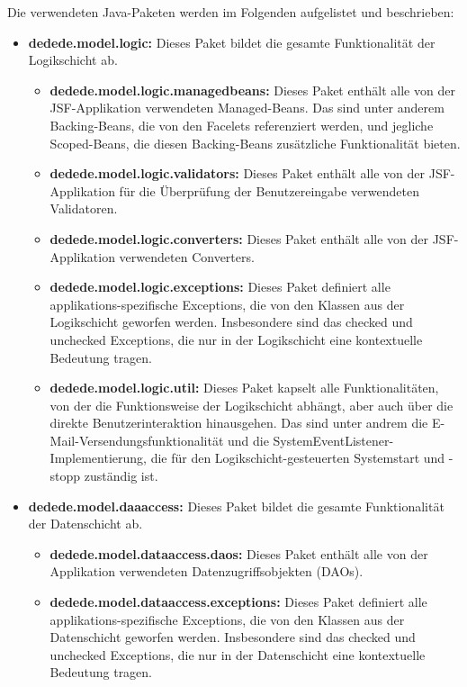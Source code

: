 \documentclass{article}
\begin{document}
Die verwendeten Java-Paketen werden im Folgenden aufgelistet und beschrieben:
\begin{itemize}
	\item \textbf{dedede.model.logic:} \hypertarget{Logikschicht}{Dieses Paket} bildet die gesamte Funktionalität der Logikschicht ab.
		\begin{itemize}
			\item \textbf{dedede.model.logic.managedbeans:} Dieses Paket enthält alle von der JSF-Applikation verwendeten Managed-Beans.
				Das sind unter anderem Backing-Beans, die von den Facelets referenziert werden, und jegliche Scoped-Beans, die diesen Backing-Beans zusätzliche Funktionalität bieten.
			\item \textbf{dedede.model.logic.validators:} Dieses Paket enthält alle von der JSF-Applikation für die Überprüfung der Benutzereingabe verwendeten Validatoren.
			\item \textbf{dedede.model.logic.converters:} Dieses Paket enthält alle von der JSF-Applikation verwendeten Converters.
			\item \textbf{dedede.model.logic.exceptions:} Dieses Paket definiert alle applikations-spezifische Exceptions, die von den Klassen aus der Logikschicht geworfen werden.
				Insbesondere sind das checked und unchecked Exceptions, die nur in der Logikschicht eine kontextuelle Bedeutung tragen.
			\item \textbf{dedede.model.logic.util:} Dieses Paket kapselt alle Funktionalitäten, von der die Funktionsweise der Logikschicht abhängt, aber auch über die direkte Benutzerinteraktion hinausgehen.
				Das sind unter andrem die E-Mail-Versendungsfunktionalität und die SystemEventListener-Implementierung, die für den Logikschicht-gesteuerten Systemstart und -stopp zuständig ist.
		\end{itemize}
	\item \textbf{dedede.model.daaaccess:} \hypertarget{DAOs}{Dieses Paket} bildet die gesamte Funktionalität der Datenschicht ab.
		\begin{itemize}
			\item \textbf{dedede.model.dataaccess.daos:} Dieses Paket enthält alle von der Applikation verwendeten Datenzugriffsobjekten (DAOs).
			\item \textbf{dedede.model.dataaccess.exceptions:} Dieses Paket definiert alle applikations-spezifische Exceptions, die von den Klassen aus der Datenschicht geworfen werden.
				Insbesondere sind das checked und unchecked Exceptions, die nur in der Datenschicht eine kontextuelle Bedeutung tragen.

\end{itemize}
\end{itemize}
\end{document}
